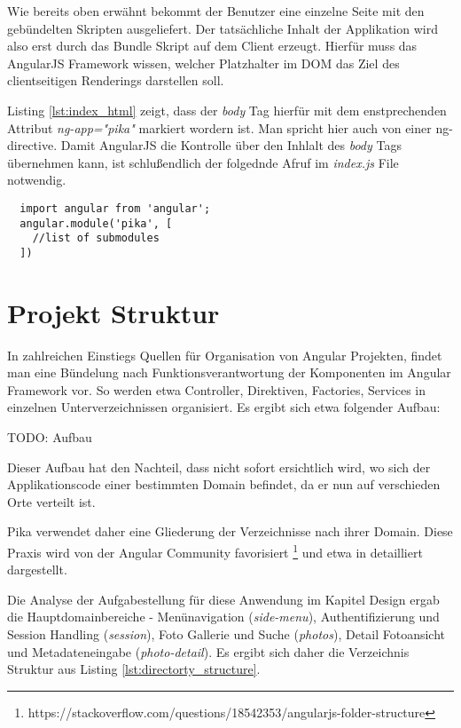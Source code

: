 Wie bereits oben erwähnt bekommt der Benutzer eine einzelne Seite mit den gebündelten Skripten ausgeliefert. Der tatsächliche Inhalt der Applikation wird also erst durch das Bundle Skript auf dem Client erzeugt. Hierfür muss das AngularJS Framework wissen, welcher Platzhalter im DOM das Ziel des clientseitigen Renderings darstellen soll.  

Listing \ref{lst:index_html} zeigt, dass der \textit{body} Tag hierfür mit dem enstprechenden Attribut \textit{ng-app="pika"} markiert wordern ist. Man spricht hier auch von einer \gls{ng-directive}. Damit AngularJS die Kontrolle über den Inhlalt des \textit{body} Tags übernehmen kann, ist schlußendlich der folgednde Afruf im \textit{index.js} File notwendig. 

\begin{listing}[H]
\begin{verbatim}
  import angular from 'angular';
  angular.module('pika', [ 
    //list of submodules 
  ])
\end{verbatim}
\end{listing}


\section{Projekt Struktur}

In zahlreichen Einstiegs Quellen für Organisation von Angular Projekten, findet man eine Bündelung nach Funktionsverantwortung der Komponenten im Angular Framework vor. So werden etwa Controller, Direktiven, Factories, Services in einzelnen Unterverzeichnissen organisiert. Es ergibt sich etwa folgender Aufbau:

TODO: Aufbau

Dieser Aufbau hat den Nachteil, dass nicht sofort ersichtlich wird, wo sich der Applikationscode einer bestimmten Domain befindet, da er nun auf verschieden Orte verteilt ist. 

Pika verwendet daher eine Gliederung der Verzeichnisse nach ihrer Domain. Diese Praxis wird von der Angular Community favorisiert \footnote{https://stackoverflow.com/questions/18542353/angularjs-folder-structure} und etwa in \cite{Kukic:2014} detailliert dargestellt.

Die Analyse der Aufgabestellung für diese Anwendung im Kapitel Design ergab die Hauptdomainbereiche - Menünavigation (\textit{side-menu}), Authentifizierung und Session Handling (\textit{session}), Foto Gallerie und Suche (\textit{photos}), Detail Fotoansicht und Metadateneingabe (\textit{photo-detail}).
Es ergibt sich daher die Verzeichnis Struktur aus Listing \ref{lst:directorty_structure}.

